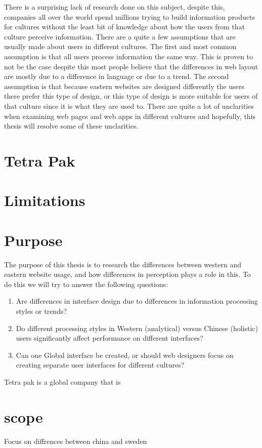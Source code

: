 There is a surprising lack of research done on this subject, despite this, companies all over the world spend millions trying to build information products for cultures without the least bit of knowledge about how the users from that culture perceive information. There are a quite a few assumptions that are usually made about users in different cultures. The first and most common assumption is that all users process information the same way. This is proven to not be the case despite this most people believe that the differences in web layout are mostly due to a difference in language or due to a trend. The second assumption is that because eastern websites are designed differently the users there prefer this type of design, or this type of design is more suitable for users of that culture since it is what they are used to. There are quite a lot of unclarities when examining web pages and web apps in different cultures and hopefully, this thesis will resolve some of these unclarities.

\section{Tetra Pak}

\section{Limitations}

\section{Purpose}
The purpose of this thesis is to research the differences between western and eastern website usage, and how differences in perception plays a role in this. To do this we will try to answer the following questions:
 \begin{enumerate}
	\item Are differences in interface design due to differences in information processing styles or trends?
	\item Do different processing styles in Western (analytical) versus Chinese (holistic) users significantly affect performance on different interfaces?
	\item Can one Global interface be created, or should web designers focus on creating separate user interfaces for different cultures?
\end{enumerate}

Tetra pak is a global company that is 
		

\section{scope}
Focus on diffrences between china and sweden


